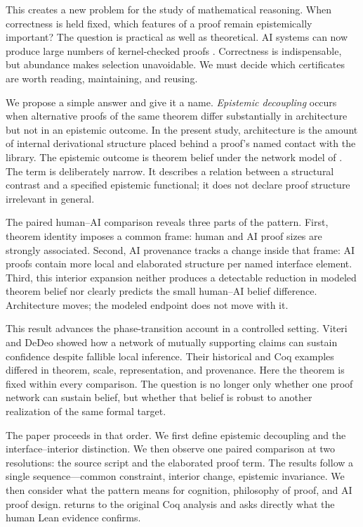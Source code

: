 \documentclass[11pt]{article}
\begin{document}
This creates a new problem for the study of mathematical reasoning.  When correctness is held fixed,
which features of a proof remain epistemically important?  The question is practical as well as
theoretical.  AI systems can now produce large numbers of kernel-checked proofs
\citep{yang2023,ren2025,hubert2026}.  Correctness is indispensable, but abundance makes selection
unavoidable.  We must decide which certificates are worth reading, maintaining, and reusing.

We propose a simple answer and give it a name.  \emph{Epistemic decoupling} occurs when alternative
proofs of the same theorem differ substantially in architecture but not in an epistemic outcome.
In the present study, architecture is the amount of internal derivational structure placed behind
a proof's named contact with the library.  The epistemic outcome is theorem belief under the network
model of \citet{viteri2022}.  The term is deliberately narrow.  It describes a relation between a
structural contrast and a specified epistemic functional; it does not declare proof structure
irrelevant in general.

The paired human--AI comparison reveals three parts of the pattern.  First, theorem identity imposes
a common frame: human and AI proof sizes are strongly associated.  Second, AI provenance tracks a
change inside that frame: AI proofs contain more local and elaborated structure per named interface
element.  Third, this interior expansion neither produces a detectable reduction in modeled theorem
belief nor clearly predicts the small human--AI belief difference.  Architecture moves; the modeled
endpoint does not move with it.

This result advances the phase-transition account in a controlled setting.  Viteri and DeDeo
showed how a network of mutually supporting claims can sustain confidence despite fallible local
inference.  Their historical and Coq examples differed in theorem, scale, representation, and
provenance.  Here the theorem is fixed within every comparison.  The question is no longer only
whether one proof network can sustain belief, but whether that belief is robust to another
realization of the same formal target.

The paper proceeds in that order.  We first define epistemic decoupling and the interface--interior
distinction.  We then observe one paired comparison at two resolutions: the source script and the
elaborated proof term.  The results follow a single sequence---common constraint, interior change,
epistemic invariance.  We then consider what the pattern means for cognition, philosophy of proof,
and AI proof design.   returns to the original Coq analysis and asks directly what
the human Lean evidence confirms.
\end{document}
